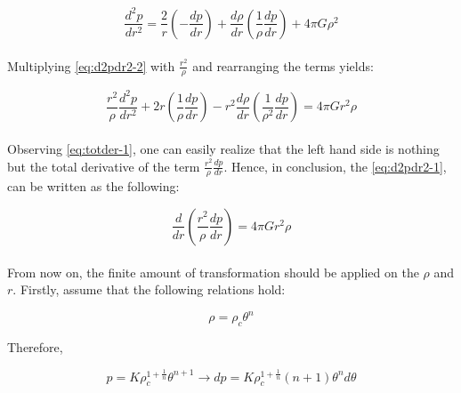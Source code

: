 \documentclass[letterpaper,12pt]{article}
\begin{document}
\begin{equation}
    \label{eq:d2pdr2-2}
    \frac{d^2p}{dr^2} = \frac{2}{r}\left(-\frac{dp}{dr}\right) + \frac{d\rho}{dr}\left(\frac{1}{\rho}\frac{dp}{dr}\right) + 4\pi G \rho^2
\end{equation}

\paragraph{}Multiplying \eqref{eq:d2pdr2-2} with $\frac{r^2}{\rho}$ and rearranging the terms yields:

\begin{equation}
    \label{eq:totder-1}
    \frac{r^2}{\rho}\frac{d^2p}{dr^2} + 2r\left(\frac{1}{\rho}\frac{dp}{dr}\right) - r^2\frac{d\rho}{dr}\left(\frac{1}{\rho^2}\frac{dp}{dr}\right) = 4\pi G r^2 \rho
\end{equation}

\paragraph{}Observing \eqref{eq:totder-1}, one can easily realize that the left hand side is nothing but the total derivative of the term $\frac{r^2}{\rho}\frac{dp}{dr}$. Hence, in conclusion, the \eqref{eq:d2pdr2-1}, can be written as the following:

\begin{equation}
    \label{eq:totder-2}
    \frac{d}{dr}\left(\frac{r^2}{\rho}\frac{dp}{dr}\right) = 4\pi G r^2 \rho
\end{equation}

\paragraph{} From now on, the finite amount of transformation should be applied on the $\rho$ and $r$. Firstly, assume that the following relations hold:

\begin{equation*}
    \rho = \rho_c \theta^n
\end{equation*}

Therefore, 

\begin{equation}
    \label{eq:dp}
    p = K \rho_c^{1+\frac{1}{n}} \theta^{n+1} \rightarrow dp = K \rho_c^{1+\frac{1}{n}} \left(n+1\right)\theta^n d\theta
\end{equation}
\end{document}
